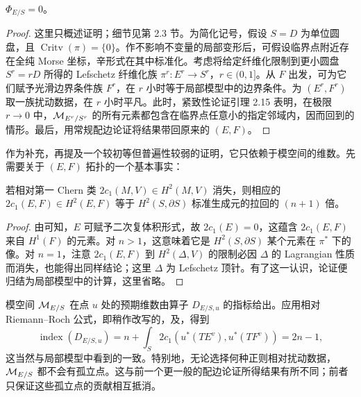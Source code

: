 \begin{lemma}\label{st:17.4}
$\Phi_{E/S}=0$。
\end{lemma}
\begin{proof}
这里只概述证明；细节见第 2.3 节。为简化记号，假设 $S=D$ 为单位圆盘，且 $\operatorname{Critv}(\pi)=\{0\}$。作不影响不变量的局部变形后，可假设临界点附近存在全纯 Morse 坐标，辛形式在其中标准化。考虑将给定纤维化限制到更小圆盘 $S^r=rD$ 所得的 Lefschetz 纤维化族 $\pi^r:E^r\to S^r$，$r\in(0,1]$。从 $F$ 出发，可为它们赋予光滑边界条件族 $F^r$，在 $r$ 小时等于局部模型中的边界条件。为 $(E^r,F^r)$ 取一族扰动数据，在 $r$ 小时平凡。此时，紧致性论证引理 2.15 表明，在极限 $r\to0$ 中，$\mathcal M_{E^r/S^r}$ 的所有元素都包含在临界点任意小的指定邻域内，因而回到的情形。最后，用常规配边论证将结果带回原来的 $(E,F)$。
\end{proof}

作为补充，再提及一个较初等但普遍性较弱的证明，它只依赖于模空间的维数。先需要关于 $(E,F)$ 拓扑的一个基本事实：

\begin{lemma}\label{st:17.5}
若相对第一 Chern 类 $2c_1(M,V)\in H^2(M,V)$ 消失，则相应的 $2c_1(E,F)\in H^2(E,F)$ 等于 $H^2(S,\partial S)$ 标准生成元的拉回的 $(n+1)$ 倍。
\end{lemma}
\begin{proof}
由可知，$E$ 可赋予二次复体积形式，故 $2c_1(E)=0$，这蕴含 $2c_1(E,F)$ 来自 $H^1(F)$ 的元素。对 $n>1$，这意味着它是 $H^2(S,\partial S)$ 某个元素在 $\pi^*$ 下的像。对 $n=1$，注意 $2c_1(E,F)$ 到 $H^2(\Delta,V)$ 的限制必因 $\Delta$ 的 Lagrangian 性质而消失，也能得出同样结论；这里 $\Delta$ 为 Lefschetz 顶针。有了这一认识，论证便归结为局部模型中的计算，这里省略。
\end{proof}

模空间 $\mathcal M_{E/S}$ 在点 $u$ 处的预期维数由算子 $D_{E/S,u}$ 的指标给出。应用相对 Riemann–Roch 公式，即稍作改写的，及，得到
\[
\operatorname{index}(D_{E/S,u})
=n+\int_S2c_1(u^*(TE^v),u^*(TF^v))=2n-1,
\]
这当然与局部模型中看到的一致。特别地，无论选择何种正则相对扰动数据，$\mathcal M_{E/S}$ 都不会有孤立点。这与前一个更一般的配边论证所得结果有所不同；前者只保证这些孤立点的贡献相互抵消。
